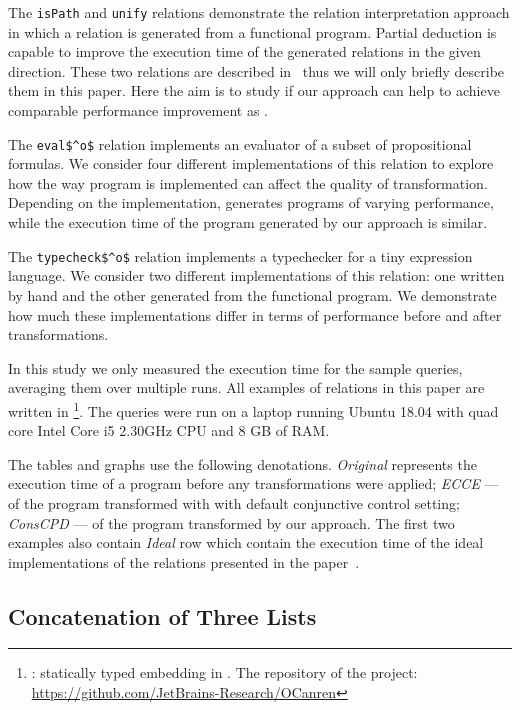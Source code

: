 The \lstinline{isPath} and \lstinline{unify} relations demonstrate the relation interpretation approach in which a relation is generated from a functional program.
Partial deduction is capable to improve the execution time of the generated relations in the given direction.
These two relations are described in~\cite{lozov2019relational} thus we will only briefly describe them in this paper.
Here the aim is to study if our approach can help to achieve comparable performance improvement as \ecce.

The \lstinline{eval$^o$} relation implements an evaluator of a subset of propositional formulas.
We consider four different implementations of this relation to explore how the way program is implemented can affect the quality of transformation.
Depending on the implementation, \ecce generates programs of varying performance, while the execution time of the program generated by our approach is similar.

The \lstinline{typecheck$^o$} relation implements a typechecker for a tiny expression language.
We consider two different implementations of this relation: one written by hand and the other generated from the functional program.
We demonstrate how much these implementations differ in terms of performance before and after transformations.

In this study we only measured the execution time for the sample queries, averaging them over multiple runs.
All examples of \mk relations in this paper are written in \oc\footnote{\oc: statically typed \mk embedding in \ocaml. The repository of the project: \url{https://github.com/JetBrains-Research/OCanren}}.
The queries were run on a laptop running Ubuntu 18.04 with quad core Intel Core i5 2.30GHz CPU and 8 GB of RAM.

The tables and graphs use the following denotations.
\emph{Original} represents the execution time of a program before any transformations were applied; \emph{ECCE} --- of the program transformed with \ecce with default conjunctive control setting; \emph{ConsCPD} --- of the program transformed by our approach.
The first two examples also contain \emph{Ideal} row which contain the execution time of the ideal implementations of the relations presented in the paper~\cite{de1999conjunctive}.

\subsection{Concatenation of Three Lists}

